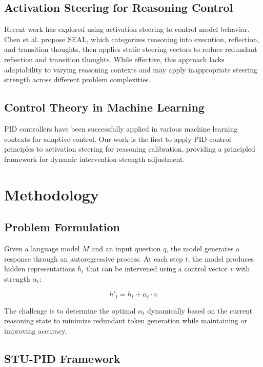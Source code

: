 \documentclass{article}
\begin{document}
\subsection{Activation Steering for Reasoning Control}

Recent work has explored using activation steering to control model behavior. Chen et al. \cite{chen2025seal} propose SEAL, which categorizes reasoning into execution, reflection, and transition thoughts, then applies static steering vectors to reduce redundant reflection and transition thoughts. While effective, this approach lacks adaptability to varying reasoning contexts and may apply inappropriate steering strength across different problem complexities.

\subsection{Control Theory in Machine Learning}

PID controllers have been successfully applied in various machine learning contexts for adaptive control. Our work is the first to apply PID control principles to activation steering for reasoning calibration, providing a principled framework for dynamic intervention strength adjustment.

\section{Methodology}

\subsection{Problem Formulation}

Given a language model $M$ and an input question $q$, the model generates a response through an autoregressive process. At each step $t$, the model produces hidden representations $h_t$ that can be intervened using a control vector $v$ with strength $\alpha_t$:

$$h'_t = h_t + \alpha_t \cdot v$$

The challenge is to determine the optimal $\alpha_t$ dynamically based on the current reasoning state to minimize redundant token generation while maintaining or improving accuracy.

\subsection{STU-PID Framework}
\end{document}
